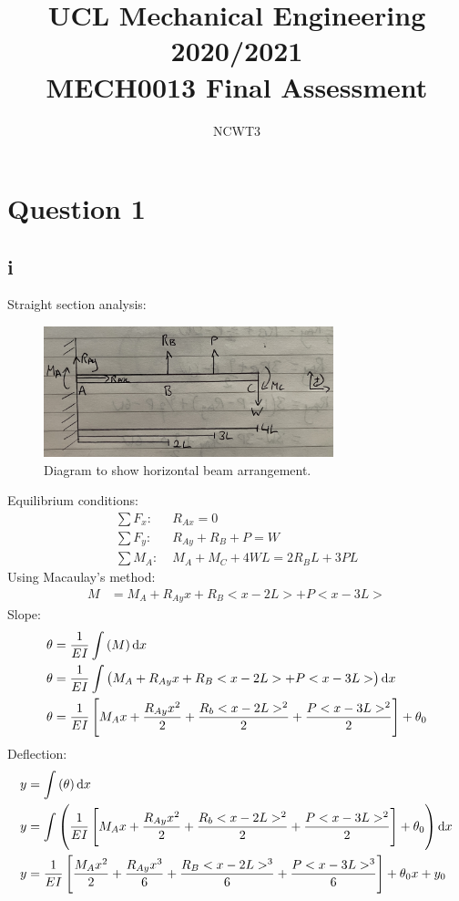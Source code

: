 \documentclass[11pt]{article}
\numberwithin{equation}{section}
\begin{document}
\title{\textbf{UCL Mechanical Engineering 2020/2021}\\MECH0013 Final Assessment}
\author{NCWT3}
\maketitle
\tableofcontents
\listoffigures
\section{Question 1}
\subsection{i}
Straight section analysis:
\begin{figure}[H]
    \centering
    \includegraphics[width = 0.75\textwidth]{./img/q1i.jpg}
    \caption{Diagram to show horizontal beam arrangement.}
    \label{fig:q1i}
\end{figure}
Equilibrium conditions:
\begin{align}
    \sum F_x: \; &R_{Ax} = 0\\
    \sum F_y: \; &R_{Ay} + R_B + P = W \label{q1isumy}\\
    \sum M_A: \; &M_A + M_C + 4WL = 2R_B L + 3PL \label{q1isumM}
\end{align}
Using Macaulay's method:
\begin{align}
    M &= M_A + R_{Ay}x + R_B <x- 2L> + P<x-3L> \label{eq:q1i1}
\end{align}
Slope:
\begin{align}
    \theta &= \frac{1}{EI} \int \left(M\right)\dif x\\
    \theta &= \frac{1}{EI} \int \left(M_A + R_{Ay}x + R_B <x- 2L> + P<x-3L>\right) \dif x\\
    \theta &= \frac{1}{EI} \left[M_A x + \frac{R_{Ay}x^2}{2} + \frac{R_b<x - 2L>^2}{2} + \frac{P<x-3L>^2}{2}\right] + \theta_0
\end{align}
Deflection:
\begin{align}
    y &= \int \left(\theta\right) \dif x\\
    y &= \int \left(\frac{1}{EI} \left[M_A x + \frac{R_{Ay}x^2}{2} + \frac{R_b<x - 2L>^2}{2} + \frac{P<x-3L>^2}{2}\right] + \theta_0\right) \dif x\\
    y &= \frac{1}{EI} \left[\frac{M_A x^2}{2} + \frac{R_{Ay}x^3}{6} + \frac{R_B<x- 2L>^3}{6} + \frac{P<x-3L>^3}{6}\right] + \theta_0 x +y_0 \label{eq:slope}
\end{align}
\end{document}
